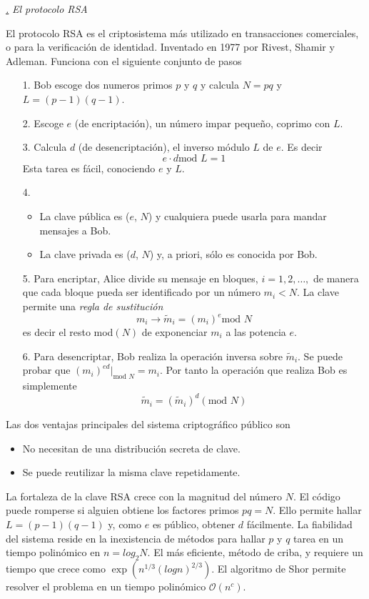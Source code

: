 \documentclass[a4paper,11pt]{book} %
\numberwithin{equation}{chapter}
\def\subsubiContadorIt{\par\addtocounter{subsubsection}{1}\underline{\it\thesubsubsection.}\hskip0.5cm \setcounter{subsubsubsectionIt}{0}}
\newcommand{\SubsubiIt}[1]{
		\subsubiContadorIt \textit{#1}
	}
\newcounter{subsubsubsectionIt}[subsubsection]
\begin{document}
			\SubsubiIt{El protocolo RSA}
	
El protocolo RSA es el criptosistema más utilizado en transacciones comerciales, o para la verificación de identidad. Inventado en 1977 por Rivest, Shamir y Adleman. Funciona con el siguiente conjunto de pasos
\begin{itemize}
	\item[1.] Bob escoge dos numeros primos $p$ y $q$ y calcula $N = pq$ y $L = (p - 1)(q - 1)$.
	\item[2.] Escoge $e$ (de encriptación), un número impar pequeño, coprimo con $L$.
	\item[3.] Calcula $d$ (de desencriptación), el inverso módulo $L$ de $e$. Es decir
		\begin{equation}
		e \cdot d \text{mod }L = 1
		\end{equation}
	Esta tarea es fácil, conociendo $e$ y $L$.
	\item[4.] 
	\begin{itemize}
		\item La clave pública es ($e$, $N$) y cualquiera puede usarla para mandar mensajes a Bob.
		\item La clave privada es ($d$, $N$) y, a priori, sólo es conocida por Bob.
	\end{itemize}
	\item[5.] Para encriptar, Alice divide su mensaje en bloques, $i = 1, 2, \dots,$ de manera que cada bloque pueda ser identificado por un número $m_i < N$. La clave permite una \textit{regla de sustitución}
		\begin{equation}
		m_i \rightarrow \tilde{m}_i = (m_i)^e \text{mod } N
		\end{equation}
		es decir el resto mod$(N)$ de exponenciar $m_i$ a las potencia $e$.
	\item[6.]  Para desencriptar, Bob realiza la operación inversa sobre $\tilde{m}_i$. Se puede probar que $(m_i)^{ed}|_{\text{mod }N} = m_i$. Por tanto la operación que realiza Bob es simplemente
		\begin{equation}
		\tilde{m}_i = (\tilde{m}_i)^d (\text{mod }N)
		\end{equation}
\end{itemize}

Las dos ventajas principales del sistema criptográfico público son
\begin{itemize}
	\item No necesitan de una distribución secreta de clave.
	\item Se puede reutilizar la misma clave repetidamente.
\end{itemize}
La fortaleza de la clave RSA crece con la magnitud del número $N$. El código puede romperse si alguien obtiene los factores primos $pq = N$. Ello permite hallar $L = (p - 1)(q - 1)$ y, como $e$ es público, obtener
$d$ fácilmente. La fiabilidad del sistema reside en la inexistencia de métodos para hallar $p$ y $q$ tarea en un tiempo polinómico en $n = log_2 N$. El más eficiente, método de criba, y requiere un tiempo que crece como $\exp( n^{1/3} (log n)^{2/3})$. El algoritmo de Shor permite resolver el problema en un tiempo polinómico $\mathcal{O}(n^c)$. 
\end{document}
